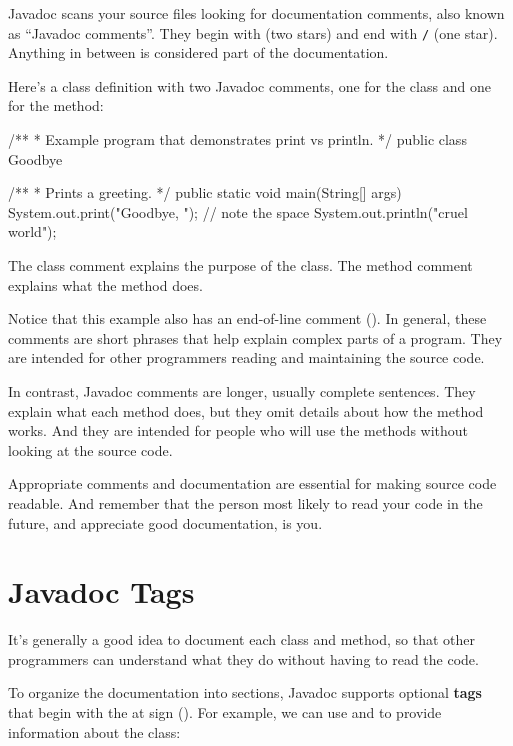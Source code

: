 Javadoc scans your source files looking for documentation comments, also known as ``Javadoc comments''.
They begin with \java{/**} (two stars) and end with \textcolor{comment}{\tt */} (one star).
Anything in between is considered part of the documentation.

Here's a class definition with two Javadoc comments, one for the  class and one for the  method:

\begin{code}
/**
 * Example program that demonstrates print vs println.
 */
public class Goodbye {

    /**
     * Prints a greeting.
     */
    public static void main(String[] args) {
        System.out.print("Goodbye, ");  // note the space
        System.out.println("cruel world");
    }
}
\end{code}

The class comment explains the purpose of the class.
The method comment explains what the method does.

Notice that this example also has an end-of-line comment (\java{//}).
In general, these comments are short phrases that help explain complex parts of a program.
They are intended for other programmers reading and maintaining the source code.

In contrast, Javadoc comments are longer, usually complete sentences.
They explain what each method does, but they omit details about how the method works.
And they are intended for people who will use the methods without looking at the source code.

Appropriate comments and documentation are essential for making source code readable.
And remember that the person most likely to read your code in the future, and appreciate good documentation, is you.


\section{Javadoc Tags}
\label{javadoc_javadoc-tags}

It's generally a good idea to document each class and method, so that other programmers can understand what they do without having to read the code.


To organize the documentation into sections, Javadoc supports optional {\bf tags} that begin with the at sign ().
For example, we can use  and  to provide information about the class:

